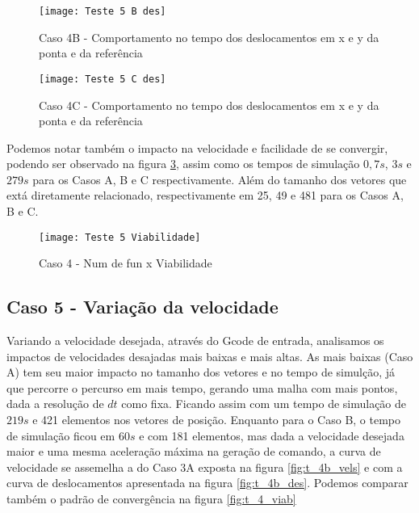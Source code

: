 \begin{figure}[H]
    \begin{center}
    \caption{Caso 4B - Comportamento no tempo dos deslocamentos em x e y da ponta e da referência}
    \texttt{[image: Teste 5 B des]}
    \label{fig:t_5b_des}
    \end{center}
\end{figure}

\begin{figure}[H]
    \begin{center}
    \caption{Caso 4C - Comportamento no tempo dos deslocamentos em x e y da ponta e da referência}
    \texttt{[image: Teste 5 C des]}
    \label{fig:t_5c_des}
    \end{center}
\end{figure}

Podemos notar também o impacto na velocidade e facilidade de se convergir, podendo ser observado na figura \ref{fig:t_5_viab}, assim
como os tempos de simulação $0,7 s$, $3 s$ e $279 s$ para os Casos A, B e C respectivamente. Além do tamanho dos vetores que extá diretamente relacionado,
respectivamente em 25, 49 e 481 para os Casos A, B e C.

\begin{figure}[H]
    \begin{center}
    \caption{Caso 4 - Num de fun x Viabilidade}
    \texttt{[image: Teste 5 Viabilidade]}
    \label{fig:t_5_viab}
    \end{center}
\end{figure}

\subsection{Caso 5 - Variação da velocidade}
Variando a velocidade desejada, através do Gcode de entrada, analisamos os impactos de velocidades desajadas mais baixas e mais altas.
As mais baixas (Caso A) tem seu maior impacto no tamanho dos vetores e no tempo de simulção, já que percorre o percurso em mais tempo,
gerando uma malha com mais pontos, dada a resolução de $dt$ como fixa. Ficando assim com um tempo de simulação de $219 s$ e 421 elementos nos vetores de posição.
Enquanto para o Caso B, o tempo de simulação ficou em $60 s$ e com 181 elementos, mas dada a velocidade desejada maior e uma mesma aceleração máxima
na geração de comando, a curva de velocidade se assemelha a do Caso 3A exposta na figura \ref{fig:t_4b_vels} e com a curva de deslocamentos apresentada na figura \ref{fig:t_4b_des}.
Podemos comparar também o padrão de convergência na figura \ref{fig:t_4_viab}

